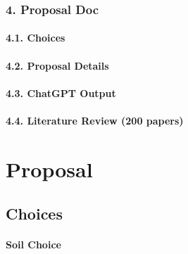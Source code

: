 \documentclass[
  letterpaper,
  DIV=11,
  numbers=noendperiod]{scrreprt}
\begin{document}
\hypertarget{proposal-doc}{%
\section*{4. Proposal Doc}\label{proposal-doc}}


\hypertarget{choices}{%
\subsection*{4.1. Choices}\label{choices}}

\hypertarget{proposal-details}{%
\subsection*{4.2. Proposal Details}\label{proposal-details}}

\hypertarget{chatgpt-output}{%
\subsection*{4.3. ChatGPT Output}\label{chatgpt-output}}

\hypertarget{literature-review-200-papers}{%
\subsection*{4.4. Literature Review (200
papers)}\label{literature-review-200-papers}}

\part{Proposal}

\hypertarget{choices-1}{%
\chapter{Choices}\label{choices-1}}

\hypertarget{soil-choice}{%
\subsection{Soil Choice}\label{soil-choice}}
\end{document}
